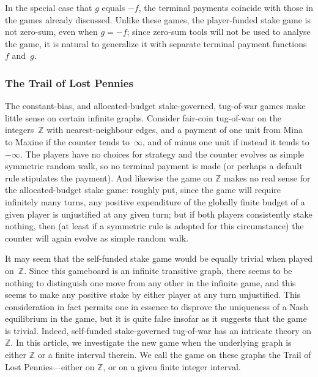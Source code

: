 \documentclass[letterpaper,11pt,oneside,reqno]{amsbook}
\newcommand{\Z}{\ensuremath{\mathbb{Z}}}
\numberwithin{figure}{chapter}
\theoremstyle{definition}
\theoremstyle{definition}
\theoremstyle{definition}
\theoremstyle{definition}
\theoremstyle{definition}
\begin{document}
In the special case that $g$ equals $-f$, the terminal payments coincide with those in the games already discussed. Unlike these games, the player-funded stake game is not zero-sum, even when $g=-f$;
since zero-sum tools will not be used to analyse the game, it is natural to generalize it with  separate terminal payment functions~$f$ and~$g$.


\medskip

\subsubsection{The Trail of Lost Pennies}


 
 The constant-bias, and allocated-budget stake-governed, tug-of-war games make little sense on certain infinite graphs. 
 Consider fair-coin tug-of-war on the integers~$\Z$ with nearest-neighbour edges, and a payment of one unit from Mina to Maxine if the counter tends to~$\infty$, and of minus one unit if instead it tends to $-\infty$. The players have no choices for strategy and the counter evolves as simple symmetric random walk, so no terminal payment is made (or perhaps a default rule stipulates the payment). And likewise the game on $\Z$ makes no real sense for the allocated-budget stake game: roughly put, since the game will require infinitely many turns, any positive expenditure of the globally finite budget of a given player is unjustified at any given turn; but if both players consistently stake nothing, then (at least if a symmetric rule is adopted for this circumstance) the counter will again evolve as simple random walk.
 
 It may seem that the self-funded stake game would be equally trivial when played on~$\Z$. Since this gameboard is an infinite transitive graph, there seems to be nothing to distinguish one move from any other in the infinite game, and this seems to make any positive stake by either player at any turn unjustified. This consideration in fact permits one in essence to disprove the uniqueness of a Nash equilibrium in the game, but it is quite false insofar as it suggests that the game is trivial. Indeed, 
 self-funded stake-governed tug-of-war has an intricate theory on $\Z$. In this article, we investigate the new game when the underlying graph is either $\Z$
 or a finite interval therein. We call the game on these graphs the Trail of Lost Pennies---either on $\Z$, or on a given finite integer interval. 
 
\end{document}
